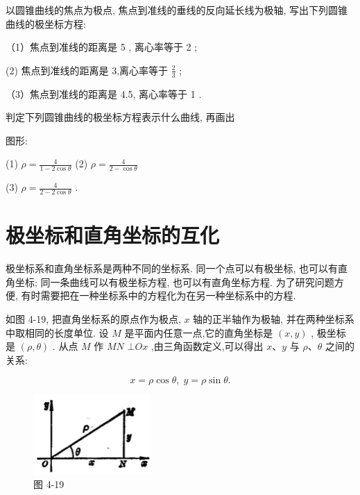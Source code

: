 \documentclass[lang=cn,newtx,10pt,scheme=chinese]{elegantbook}
\begin{document}
\begin{problemset}[练习]

\item 以圆锥曲线的焦点为极点, 焦点到准线的垂线的反向延长线为极轴, 写出下列圆锥曲线的极坐标方程:

（1）焦点到准线的距离是 5 , 离心率等于 2 ;

(2) 焦点到准线的距离是 3,离心率等于 \(\frac{2}{3}\) ;

（3）焦点到准线的距离是 4.5, 离心率等于 1 .

\item 判定下列圆锥曲线的极坐标方程表示什么曲线, 再画出

图形:

(1) \(\rho = \frac{4}{1 - 2\cos \theta }\) (2) \(\rho = \frac{4}{2 - \cos \theta }\)

(3) \(\rho = \frac{4}{2 - 2\cos \theta }\) .

\end{problemset}

\section{极坐标和直角坐标的互化}

极坐标系和直角坐标系是两种不同的坐标系. 同一个点可以有极坐标, 也可以有直角坐标; 同一条曲线可以有极坐标方程, 也可以有直角坐标方程. 为了研究问题方便, 有时需要把在一种坐标系中的方程化为在另一种坐标系中的方程.

如图 4-19, 把直角坐标系的原点作为极点, \(x\) 轴的正半轴作为极轴, 并在两种坐标系中取相同的长度单位. 设 \(M\) 是平面内任意一点,它的直角坐标是 \(\left( {x,y}\right)\) , 极坐标是 \(\left( {\rho ,\theta }\right)\) . 从点 \(M\) 作 \({MN}\) \(\bot {Ox}\) ,由三角函数定义,可以得出 \(x\text{、}y\) 与 \(\rho \text{、}\theta\) 之间的关系:

\[
  x = \rho \cos \theta ,\;y = \rho \sin \theta . \tag{1}
\]

\begin{figure}[h]
  \centering
  \includegraphics[max width=0.4\textwidth]{images/01912cc2-ffb6-728e-9ae7-b113ff05c64b_181_622758.jpg}
  \caption{图 4-19}
\end{figure}
\end{document}
